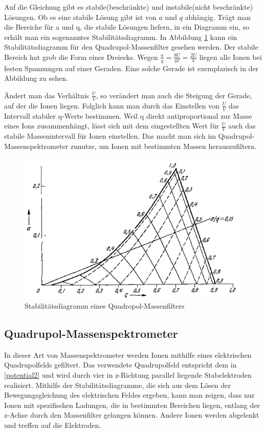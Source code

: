\documentclass[10pt,a4paper]{article}
\begin{document}
Auf die Gleichung gibt es stabile(beschränkte) und instabile(nicht beschränkte) Lösungen. Ob es eine stabile Lösung gibt ist von $a$ und $q$ abhängig. Trägt man die Bereiche für a und q, die stabile Lösungen liefern, in ein Diagramm ein, so erhält man ein sogenanntes Stabilitätsdiagramm. In Abbildung \ref{stabilitatsdiagramm1} kann ein Stabilitätsdiagramm für den Quadrupol-Massenfilter gesehen werden. Der stabile Bereich hat grob die Form eines Dreiecks. Wegen $\frac{a}{q} = \frac{8 U}{4 V} = \frac{2 U}{V}$ liegen alle Ionen bei festen Spannungen auf einer Geraden. Eine solche Gerade ist exemplarisch in der Abbildung zu sehen. 

Ändert man das Verhältnis $\frac{U}{V}$, so verändert man auch die Steigung der Gerade, auf der die Ionen liegen. Folglich kann man durch das Einstellen von $\frac{U}{V}$ das Intervall stabiler q-Werte bestimmen. Weil q direkt antiproportional zur Masse eines Ions zusammenhängt, lässt sich mit dem eingestellten Wert für $\frac{U}{V}$ auch das stabile Massenintervall für Ionen einstellen. Das macht man sich im Quadrupol-Massenspektrometer zunutze, um Ionen mit bestimmten Massen herauszufiltern.

\begin{figure}[h]
	\centering
	\includegraphics[scale = 0.8]{stabilitatsdiagramm.png}
	\caption{Stabilitätsdiagramm eines Quadropol-Massenfilters}
	\label{stabilitatsdiagramm1}
\end{figure}

\subsection{Quadrupol-Massenspektrometer}

In dieser Art von Massenspektrometer werden Ionen mithilfe eines elektrischen Quadrupolfelds gefiltert. Das verwendete Quadrupolfeld entspricht dem in \eqref{potential2} und wird durch vier in z-Richtung parallel liegende Stabelektroden realisiert. Mithilfe der Stabilitätsdiagramme, die sich aus dem Lösen der Bewegungsgleichung des elektrischen Feldes ergeben, kann man zeigen, dass nur Ionen mit spezifischen Ladungen, die in bestimmten Bereichen liegen, entlang der z-Achse durch den Massenfilter gelangen können. Andere Ionen werden abgelenkt und treffen auf die Elektroden.
\end{document}
